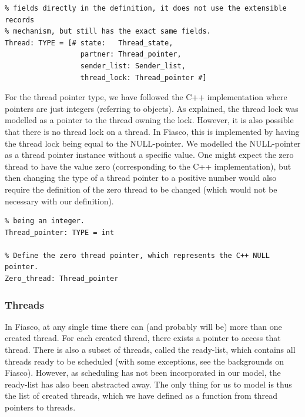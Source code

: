 \lstset{language=PVS}
\begin{lstlisting}[caption={PVS: thread alternative definition.}]
% This alternative thread type definition includes the sender's and receiver's
% fields directly in the definition, it does not use the extensible records
% mechanism, but still has the exact same fields.
Thread: TYPE = [# state:   Thread_state,
                  partner: Thread_pointer,
                  sender_list: Sender_list,
                  thread_lock: Thread_pointer #]
\end{lstlisting}

For the thread pointer type, we have followed the C++ implementation where pointers are just integers (referring to objects). As explained, the thread lock was modelled as a pointer to the thread owning the lock. However, it is also possible that there is no thread lock on a thread. In Fiasco, this is implemented by having the thread lock being equal to the NULL-pointer. We modelled the NULL-pointer as a thread pointer instance without a specific value. One might expect the zero thread to have the value zero (corresponding to the C++ implementation), but then changing the type of a thread pointer to a positive number would also require the definition of the zero thread to be changed (which would not be necessary with our definition).

\lstset{language=PVS}
\begin{lstlisting}[caption={PVS: thread pointer definition.}]
% A pointer to a thread is just an integer, this reflects a C++ pointer also
% being an integer.
Thread_pointer: TYPE = int

% Define the zero thread pointer, which represents the C++ NULL pointer.
Zero_thread: Thread_pointer
\end{lstlisting}

\subsubsection{Threads}
In Fiasco, at any single time there can (and probably will be) more than one created thread. For each created thread, there exists a pointer to access that thread. There is also a subset of threads, called the ready-list, which contains all threads ready to be scheduled (with some exceptions, see the backgrounds on Fiasco). However, as scheduling has not been incorporated in our model, the ready-list has also been abstracted away. The only thing for us to model is thus the list of created threads, which we have defined as a function from thread pointers to threads.

